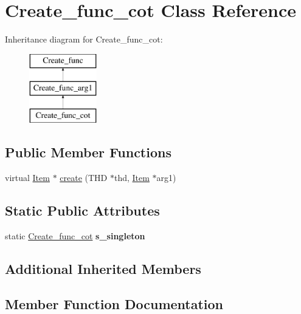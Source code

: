 \hypertarget{classCreate__func__cot}{}\section{Create\+\_\+func\+\_\+cot Class Reference}
\label{classCreate__func__cot}
Inheritance diagram for Create\+\_\+func\+\_\+cot\+:\begin{figure}[H]
\begin{center}
\leavevmode
\includegraphics[height=3.000000cm]{classCreate__func__cot}
\end{center}
\end{figure}
\subsection*{Public Member Functions}
\begin{DoxyCompactItemize}
\item 
virtual \mbox{\hyperlink{classItem}{Item}} $\ast$ \mbox{\hyperlink{classCreate__func__cot_ae5d6cd786c05a2b92defac8b33a7bb7b}{create}} (T\+HD $\ast$thd, \mbox{\hyperlink{classItem}{Item}} $\ast$arg1)
\end{DoxyCompactItemize}
\subsection*{Static Public Attributes}
\begin{DoxyCompactItemize}
\item 
\mbox{\label{classCreate__func__cot_a883653aa889bdffc7eb4526cdd28e923}} 
static \mbox{\hyperlink{classCreate__func__cot}{Create\+\_\+func\+\_\+cot}} {\bfseries s\+\_\+singleton}
\end{DoxyCompactItemize}
\subsection*{Additional Inherited Members}


\subsection{Member Function Documentation}
\mbox{\label{classCreate__func__cot_ae5d6cd786c05a2b92defac8b33a7bb7b}} 
